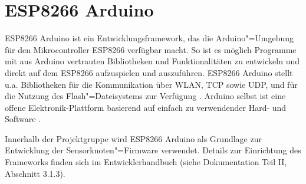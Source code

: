 \section{ESP8266 Arduino}
ESP8266 Arduino ist ein Entwicklungsframework, das die Arduino"=Umgebung für den Mikrocontroller ESP8266 verfügbar macht.
So ist es möglich Programme mit aus Arduino vertrauten Bibliotheken und Funktionalitäten zu entwickeln und direkt auf dem ESP8266 aufzuspielen und auszuführen.
ESP8266 Arduino stellt u.a. Bibliotheken für die Kommunikation über WLAN, TCP sowie UDP, und für die Nutzung des Flash"=Dateisystems zur Verfügung \cite{arduinoESP}.
Arduino selbst ist eine offene Elektronik-Plattform basierend auf einfach zu verwendender Hard- und Software \cite{arduino}.

Innerhalb der Projektgruppe wird ESP8266 Arduino als Grundlage zur Entwicklung der Sensorknoten"=Firmware verwendet.
Details zur Einrichtung des Frameworks finden sich im Entwicklerhandbuch (siehe Dokumentation Teil II, Abschnitt 3.1.3).

